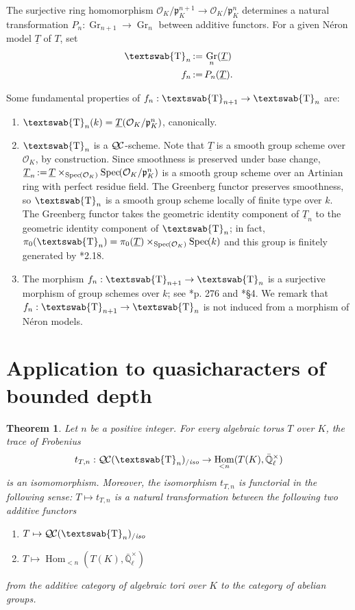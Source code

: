 \documentclass[11pt]{amsart}
\makeatletter
\newcommand{\mathswab}[1]{\operatorname{\textswab{#1}}}
\theoremstyle{plain}
\newtheorem{theorem}{Theorem}[section]
\theoremstyle{definition}
\theoremstyle{remark}
\newcommand{\Spec}[1]{{\operatorname{Spec}\hskip-1pt( #1 )}}
\newcommand{\EE}{\mathbb{\bar Q}_\ell}
\newcommand{\OK}{\mathcal{O}_K}
\newcommand{\pK}{\mathfrak{p}_K}
\newcommand{\Fq}{k}
\newcommand{\EEx}{\EE^\times}
\DeclareMathOperator{\Hom}{Hom}
\DeclareMathOperator{\Gr}{Gr}
\newcommand{\ceq}{{\, :=\, }}
\newcommand{\GN}[1]{\mathswab{#1}}
\newcommand{\TT}{\underline{T}}
\newcommand{\QC}{{\mathcal{Q\hskip-0.8pt C}}}
\newcommand{\QCiso}[1]{\QC(#1)_{/\textit{iso}}}
\newcommand{\trFrob}[1]{t_{#1}}
\newcommand{\labitem}[2]{%
\def\@itemlabel{\textbf{#1}}
\item
\def\@currentlabel{#1}\label{#2}}
\makeatother
\begin{document}
The surjective ring homomorphism $\OK/\pK^{n+1} \to \OK/\pK^n$ determines a
natural transformation $P_{n} : \Gr_{n+1} \to \Gr_n$ between additive functors.
For a given Néron model $\TT$ of $T$, set
\begin{align*}
 \GN{T}_n &\ceq \Gr_n(\TT) \\
 f_n &\ceq P_n(\TT).
\end{align*}

Some fundamental properties of $f_n : \GN{T}_{n+1} \to \GN{T}_n$ are:
 \begin{enumerate}
   \labitem{(GN.0)}{points} $\GN{T}_n(\Fq) = \TT(\OK/\pK^n)$, canonically.
  \labitem{(GN.1)}{smooth} 
  $\GN{T}_n$ is a $\QC$-scheme. 
  Note that $\underline{T}$ is a smooth group scheme over $\OK$, by construction. 
  Since smoothness is preserved under base change, 
  $\TT_n \ceq \underline{T} \times_\Spec{\OK} \Spec{\OK/\pK^n}$ 
  is a smooth group scheme over an Artinian ring with perfect residue field. 
  The Greenberg functor preserves smoothness, 
  so $\GN{T}_n$ is a smooth group scheme locally of finite type over $\Fq$. 
  The Greenberg functor takes the geometric identity component of $\TT_n$ 
  to the geometric identity component of $\GN{T}_n$;
  in fact, $\pi_0(\GN{T}_n) = \pi_0(\TT) \times_{\Spec{\OK}} \Spec{\Fq}$ and
  this group is finitely generated by \cite{xarles:93a}*{2.18}.
  \labitem{(GN.2)}{truncation}
  The morphism $f_n : \GN{T}_{n+1} \to \GN{T}_n$ is a surjective morphism of group schemes over $\Fq$; 
  see  \cite{bosch-lutkebohmert-reynaud:NeronModels}*{p. 276}
  and  \cite{stasinski:12a}*{\S 4}.
  We remark that $f_n : \GN{T}_{n+1} \to \GN{T}_n$ is not induced from a morphism of Néron models.
\end{enumerate}

\section{Application to quasicharacters of bounded depth} \label{sec:bdchar}

\begin{theorem}\label{thm:application}
Let $n$ be a positive integer.
For every algebraic torus $T$ over $K$, the trace of Frobenius 
  \[
\trFrob{T,n}:  \QCiso{\GN{T}_n} \to \Hom_{< n}(T(K),\EEx)
  \]
is an isomomorphism. 
Moreover, the isomorphism $\trFrob{T,n}$ is functorial in the following sense:
$T \mapsto \trFrob{T,n}$ is a natural transformation between the following two additive functors
\begin{enumerate}
\item[$F_1$:] $T \mapsto \QCiso{\GN{T}_n}$
\item[$F_2$:] $T \mapsto \Hom_{<n}(T(K),\EEx)$
\end{enumerate}
from the additive category of algebraic tori over $K$ to the category of abelian groups.
\end{theorem}
\end{document}
